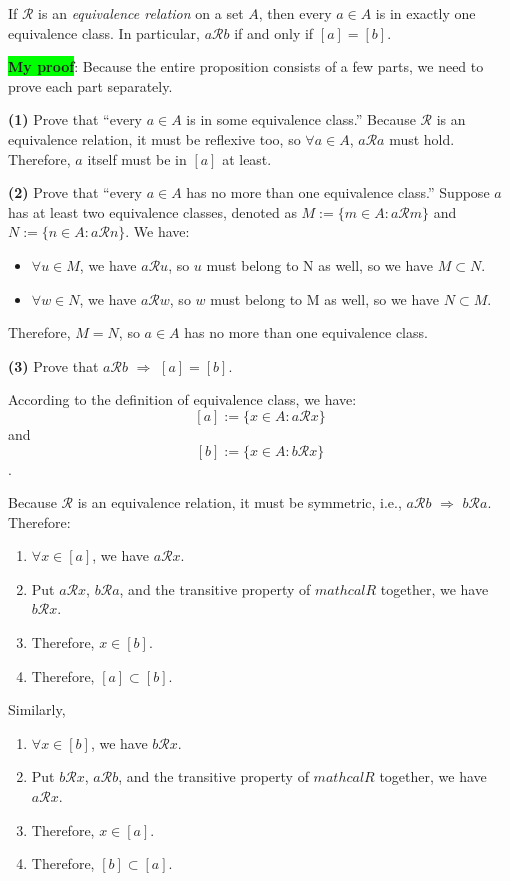 \documentclass[12pt, letterpaper, oneside]{book}
\begin{document}
If $\mathcal{R}$ is an \textit{equivalence relation} on a set $A$, then every
$a \in A$ is in exactly one equivalence class. In particular, $a \mathcal{R} b$
if and only if $[a] = [b]$.

\colorbox{lime}{\textbf{My proof}}: Because the entire proposition consists of
a few parts, we need to prove each part separately.

\textbf{(1)} Prove that ``every $a \in A$ is in some equivalence class.''
Because $\mathcal{R}$ is an equivalence relation, it must be reflexive too, so
$\forall a \in A$, $a \mathcal{R} a$ must hold. Therefore, $a$ itself must be
in $[a]$ at least.

\textbf{(2)} Prove that ``every $a \in A$ has no more than one equivalence
class.'' Suppose $a$ has at least two equivalence classes, denoted as $M := \{
  m \in A: a \mathcal{R} m\}$ and $N := \{n \in A: a \mathcal{R} n\}$. We have:

\begin{itemize}
  \item $\forall u \in M$, we have $a \mathcal{R} u$, so $u$ must belong to N
        as well, so we have $M \subset N$.
  \item $\forall w \in N$, we have $a \mathcal{R} w$, so $w$ must belong to M
        as well, so we have $N \subset M$.
\end{itemize}

Therefore, $M = N$, so $a \in A$ has no more than one equivalence class.

\textbf{(3)} Prove that $a \mathcal{R} b$ $\Rightarrow$ $[a] = [b]$.

According to the definition of equivalence class, we have: \[[a] := \{x \in A:
  a \mathcal{R} x\}\] and \[[b] := \{x \in A: b \mathcal{R} x\}\].

Because $\mathcal{R}$ is an equivalence relation, it must be symmetric, i.e.,
$a \mathcal{R} b$ $\Rightarrow$ $b \mathcal{R} a$. Therefore:
\begin{enumerate}
  \item $\forall x \in [a]$, we have $a \mathcal{R} x$.
  \item Put $a \mathcal{R} x$, $b \mathcal{R} a$, and the transitive property
        of $mathcal{R}$ together, we have $b \mathcal{R} x$.
  \item Therefore, $x \in [b]$.
  \item Therefore, $[a] \subset [b]$.
\end{enumerate}

Similarly,
\begin{enumerate}
  \item $\forall x \in [b]$, we have $b \mathcal{R} x$.
  \item Put $b \mathcal{R} x$, $a \mathcal{R} b$, and the transitive property
        of $mathcal{R}$ together, we have $a \mathcal{R} x$.
  \item Therefore, $x \in [a]$.
  \item Therefore, $[b] \subset [a]$.
\end{enumerate}
\end{document}
